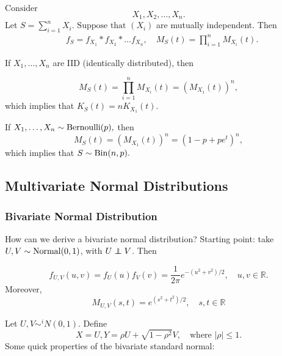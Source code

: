 \begin{eg}
$\text{Consider }$ $$ X_1, X_2, \dots, X_n.$$ Let $S=\sum_{i=1}^nX_i.$ $\text{Suppose that } (X_i)$ are mutually independent. Then
\begin{align*}
    &f_S=f_{X_1}* f_{X_2}*\dots f_{X_n}, \quad M_S(t)=\prod^n_{i=1} M_{X_i}(t).
\end{align*}
\end{eg}

If $X_1,\dots, X_n$ are IID (identically distributed), then 

$$
M_S(t)=\prod^n_{i=1}M_{X_i}(t)=(M_{X_1}(t))^n,
$$
which implies that $K_S(t)=nK_{X_1}(t).$

\begin{eg}
If $X_1,\dots,X_n\sim \operatorname*{Bernoulli}(p),$ then
$$
M_S(t)=(M_{X_1}(t))^n=(1-p+pe^t)^n,
$$
which implies that $S\sim \operatorname*{Bin}(n,p).$
\end{eg}
    
\subsection{Multivariate Normal Distributions}

\subsubsection{Bivariate Normal Distribution}

How can we derive a bivariate normal distribution? Starting point: take $U,V\sim \operatorname*{Normal}(0,1)$, with $U\ind V$. Then

$$f_{U,V}(u,v)=f_U(u)f_V(v)=\frac{1}{2\pi}e^{-(u^2+v^2)/2}, \quad u,v\in \mathbb R.$$
Moreover,
$$
M_{U,V}(s,t)=e^{(s^2+t^2)/2}, \quad s,t\in\mathbb R 
$$

Let $U,V\sim^i N(0,1).$ Define
$$
X=U, Y=\rho U+\sqrt{1-\rho^2}V, \quad \text{where } |\rho|\leq 1.
$$
Some quick properties of the bivariate standard normal:

